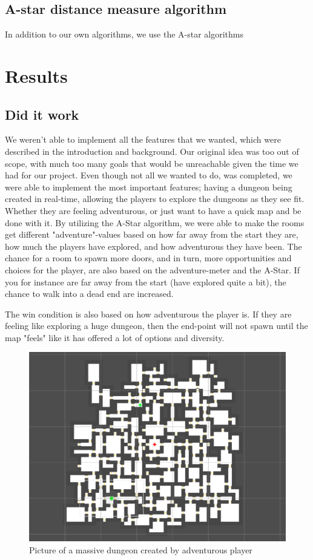\documentclass[conference,compsoc]{IEEEtran}
\begin{document}
\subsection{A-star distance measure algorithm}
\label{sec:astar}
In addition to our own algorithms, we use the A-star algorithms 

\section{Results}
\subsection{Did it work}
We weren't able to implement all the features that we wanted, which were described in the introduction and background. Our original idea was too out of scope, with much too many goals that would be unreachable given the time we had for our project. Even though not all we wanted to do, was completed, we were able to implement the most important features; having a dungeon being created in real-time, allowing the players to explore the dungeons as they see fit. Whether they are feeling adventurous, or just want to have a quick map and be done with it. 
By utilizing the A-Star algorithm, we were able to make the rooms get different "adventure"-values based on how far away from the start they are, how much the players have explored, and how adventurous they have been. The chance for a room to spawn more doors, and in turn, more opportunities and choices for the player, are also based on the adventure-meter and the A-Star. If you for instance are far away from the start (have explored quite a bit), the chance to walk into a dead end are increased.

The win condition is also based on how adventurous the player is. If they are feeling like exploring a huge dungeon, then the end-point will not spawn until the map "feels" like it has offered a lot of options and diversity.

\begin{figure}[h]
	\graphicspath{{figures/}}
	\includegraphics[width = \columnwidth ]{BigDungeon.png}
	\caption{Picture of a massive dungeon created by adventurous player}
	\label{fig:behavTree}
\end{figure}
\end{document}
